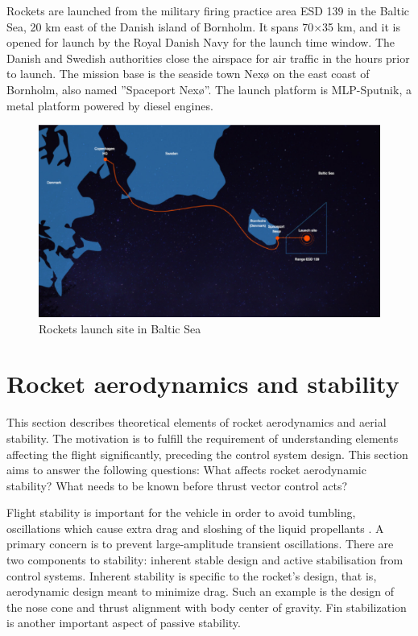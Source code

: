 Rockets are launched from the military firing practice area ESD 139 in the Baltic Sea, 20 km east of the Danish island of Bornholm. It spans 70×35 km, and it is opened for launch by the Royal Danish Navy for the launch time window. 
The Danish and Swedish authorities close the airspace for air traffic in the hours prior to launch. The mission base is the seaside town Nexø on the east coast of Bornholm, also named ''Spaceport Nexø''. The launch platform is MLP-Sputnik, a metal platform powered by diesel engines. 

\begin{figure}[H]
  \centering
  \includegraphics[scale=1]{graphics/launchsite.png}
  \caption{Rockets launch site in Baltic Sea}
  \label{launchsite}
\end{figure}

\section{Rocket aerodynamics and stability }

This section describes theoretical elements of rocket aerodynamics and aerial stability. The motivation is to fulfill the requirement of understanding elements affecting the flight significantly, preceding the control system design.
This section aims to answer the following questions: What affects rocket aerodynamic stability? What needs to be known before thrust vector control acts?

Flight stability is important for the vehicle in order to avoid tumbling, oscillations which cause extra drag and sloshing of the liquid propellants \cite{sutton2016rocket}. A primary concern is to prevent large-amplitude transient oscillations.
There are two components to stability: inherent stable design and active stabilisation from control systems. 
Inherent stability is specific to the rocket's design, that is, aerodynamic design meant to minimize drag. Such an example is the design of the nose cone and thrust alignment with body center of gravity. Fin stabilization is another important aspect of passive stability. 

